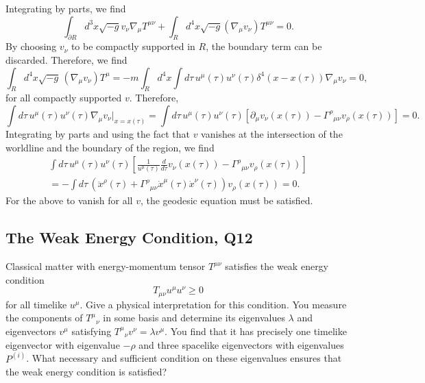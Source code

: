 \begin{enumerate}[label=\roman*)]
\begin{solution}
        Integrating by parts, we find
        \begin{equation}
            \int_{\partial R} d^3x\sqrt{-g}v_\nu \nabla_\mu T^{\mu\nu} +\int_R d^4x \sqrt{-g}(\nabla_\mu v_\nu)T^{\mu\nu} = 0.
        \end{equation}
        By choosing $v_\nu$ to be compactly supported in $R$, the boundary term can be discarded. Therefore, we find
        \begin{equation}
            \int_R d^4x \sqrt{-g}\, (\nabla_\mu v_\nu) T^\mu = -m\int_R d^4x\int d\tau \,u^\mu(\tau)u^\nu(\tau)\delta^4(x-x(\tau)) \nabla_\mu v_\nu = 0,
        \end{equation}
        for all compactly supported $v$. Therefore,
        \begin{equation}
            \int d\tau\, u^\mu(\tau)u^\nu(\tau) \nabla_\mu v_\nu \bigg|_{x=x(\tau)} = \int d\tau\, u^\mu(\tau) u^\nu(\tau) [\partial_\mu v_\nu(x(\tau)) - \Gamma^\rho{}_{\mu\nu}v_\rho(x(\tau))]= 0.
        \end{equation}
        Integrating by parts and using the fact that $v$ vanishes at the intersection of the worldline and the boundary of the region, we find
        \begin{equation}
        \begin{aligned}
            \int d\tau \, u^\mu(\tau) u^\nu(\tau) \left[ \frac{1}{u^\mu(\tau)}\frac{d}{d\tau}v_\nu(x(\tau)) - \Gamma^\rho{}_{\mu\nu}v_\rho(x(\tau))\right] \\= -\int d\tau \, \left(\ddot{x}^\rho(\tau) + \Gamma^\rho{}_{\mu\nu}\dot{x}^\mu(\tau)\dot{x}^\nu(\tau)\right)v_\rho(x(\tau))=0.
        \end{aligned}
        \end{equation}
        For the above to vanish for all $v$, the geodesic equation must be satisfied.
    \end{solution}
\end{enumerate}

\subsection{The Weak Energy Condition, Q12}

Classical matter with energy-momentum tensor $T^{\mu\nu}$ satisfies the weak energy condition
\begin{equation}
    T_{\mu\nu}u^\mu u^\nu \geq 0
\end{equation}
for all timelike $u^\mu$. Give a physical interpretation for this condition. You measure the components of $T^\mu{}_\nu$ in some basis and determine its eigenvalues $\lambda$ and eigenvectors $v^\mu$ satisfying $T^\mu{}_\nu v^\nu = \lambda v^\mu$. You find that it has precisely one timelike eigenvector with eigenvalue $-\rho$ and three spacelike eigenvectors with eigenvalues $P^{(i)}$. What necessary and sufficient condition on these eigenvalues ensures that the weak energy condition is satisfied?

